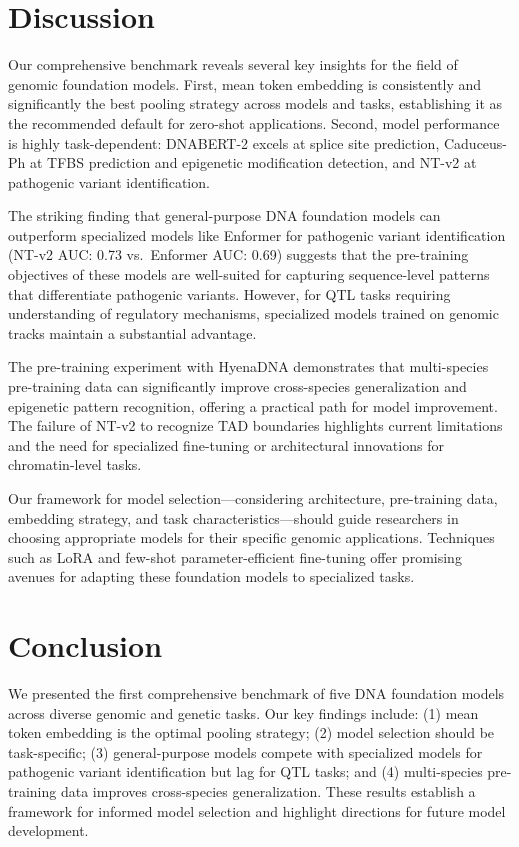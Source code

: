 \documentclass{article}
\begin{document}
\section{Discussion}

Our comprehensive benchmark reveals several key insights for the field of genomic foundation models. First, mean token embedding is consistently and significantly the best pooling strategy across models and tasks, establishing it as the recommended default for zero-shot applications. Second, model performance is highly task-dependent: DNABERT-2 excels at splice site prediction, Caduceus-Ph at TFBS prediction and epigenetic modification detection, and NT-v2 at pathogenic variant identification.

The striking finding that general-purpose DNA foundation models can outperform specialized models like Enformer for pathogenic variant identification (NT-v2 AUC: 0.73 vs.\ Enformer AUC: 0.69) suggests that the pre-training objectives of these models are well-suited for capturing sequence-level patterns that differentiate pathogenic variants. However, for QTL tasks requiring understanding of regulatory mechanisms, specialized models trained on genomic tracks maintain a substantial advantage.

The pre-training experiment with HyenaDNA demonstrates that multi-species pre-training data can significantly improve cross-species generalization and epigenetic pattern recognition, offering a practical path for model improvement. The failure of NT-v2 to recognize TAD boundaries highlights current limitations and the need for specialized fine-tuning or architectural innovations for chromatin-level tasks.

Our framework for model selection---considering architecture, pre-training data, embedding strategy, and task characteristics---should guide researchers in choosing appropriate models for their specific genomic applications. Techniques such as LoRA \citep{hu2021lora} and few-shot parameter-efficient fine-tuning \citep{liu2022few} offer promising avenues for adapting these foundation models to specialized tasks.

\section{Conclusion}

We presented the first comprehensive benchmark of five DNA foundation models across diverse genomic and genetic tasks. Our key findings include: (1) mean token embedding is the optimal pooling strategy; (2) model selection should be task-specific; (3) general-purpose models compete with specialized models for pathogenic variant identification but lag for QTL tasks; and (4) multi-species pre-training data improves cross-species generalization. These results establish a framework for informed model selection and highlight directions for future model development.



\end{document}
